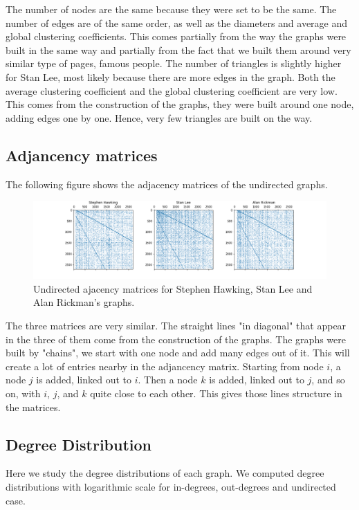 \documentclass[conference]{IEEEtran}
\begin{document}
The number of nodes are the same because they were set to be the same. The number of edges are of the same order, as well as the diameters and average and global clustering coefficients. This comes partially from the way the graphs were built in the same way and partially from the fact that we built them around very similar type of pages, famous people. The number of triangles is slightly higher for Stan Lee, most likely because there are more edges in the graph. Both the average clustering coefficient and the global clustering coefficient are very low. This comes from the construction of the graphs, they were built around one node, adding edges one by one. Hence, very few triangles are built on the way. 

\subsection{Adjancency matrices}
 The following figure shows the adjacency matrices of the undirected graphs.
 
\begin{figure}[!htb]
  \includegraphics[width=\linewidth]{matrices.png}
\caption{Undirected ajacency matrices for Stephen Hawking, Stan Lee and Alan Rickman's graphs. }
\end{figure}

The three matrices are very similar. The straight lines "in diagonal" that appear in the three of them come from the construction of the graphs. The graphs were built by "chains", we start with one node and add many edges out of it. This will create a lot of entries nearby in the adjancency matrix. Starting from node $i$, a node $j$ is added, linked out to $i$. Then a node $k$ is added, linked out to $j$, and so on, with $i$, $j$, and $k$ quite close to each other. This gives those lines structure in the matrices. 

\subsection{Degree Distribution}

Here we study the degree distributions of each graph. We computed degree distributions with logarithmic scale for in-degrees, out-degrees and undirected case. 
\end{document}
